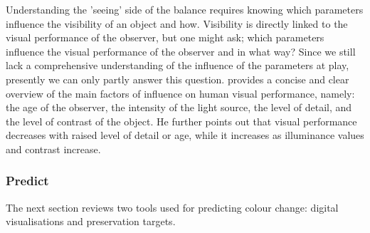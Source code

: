 Understanding the 'seeing' side of the balance requires  knowing which parameters influence the visibility of an object and how. Visibility is directly linked to the visual performance of the observer, but one might ask; which parameters influence the visual performance of the observer and in what way? Since we still lack a comprehensive understanding of the influence of the parameters at play, presently we can only partly answer this question. \citet{saunders_museum_2020} provides a concise and clear overview of the main factors of influence on human visual performance, namely:  the age of the observer, the intensity of the light source, the level of detail, and the level of contrast of the object. He further points out that visual performance decreases with raised level of detail or age, while it increases as illuminance values and contrast increase. \\


\subsubsection{Predict}
\label{sec:predict}

The next section reviews two tools used for predicting colour change: digital visualisations and preservation targets. \\

